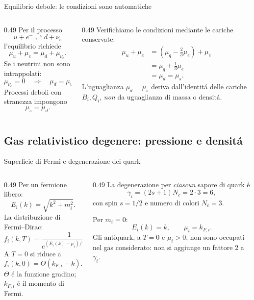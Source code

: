 \begin{frame}[t]{Equilibrio debole: le condizioni sono automatiche}
\small
\begin{columns}[T,onlytextwidth]
\begin{column}{0.49\textwidth}
Per il processo
\[
u+e^-\rightleftharpoons d+\nu_e
\]
l'equilibrio richiede
\[
\mu_u+\mu_e=\mu_d+\mu_{\nu_e}.
\]
Se i neutrini non sono intrappolati:
\[
\mu_{\nu_e}=0
\quad\Rightarrow\quad
\mu_d=\mu_u+\mu_e.
\]
Processi deboli con stranezza impongono
\[
\mu_s=\mu_d.
\]
\end{column}
\begin{column}{0.49\textwidth}
Verifichiamo le condizioni mediante le cariche conservate:
\[
\begin{aligned}
\mu_u+\mu_e
&=\left(\mu_q-\tfrac23\mu_e\right)+\mu_e\\
&=\mu_q+\tfrac13\mu_e\\
&=\mu_d=\mu_s.
\end{aligned}
\]
L'uguaglianza $\mu_d=\mu_s$ deriva dall'identit\'a delle cariche $B_i,Q_i$, \emph{non} da uguaglianza di massa o densit\'a.
\end{column}
\end{columns}
\end{frame}

\subsection{Gas relativistico degenere: pressione e densit\'a}

\begin{frame}[t]{Superficie di Fermi e degenerazione dei quark}
\small
\begin{columns}[T,onlytextwidth]
\begin{column}{0.49\textwidth}
Per un fermione libero:
\[
E_i(k)=\sqrt{k^2+m_i^2}.
\]
La distribuzione di Fermi--Dirac:
\[
f_i(k,T)=\frac{1}{e^{(E_i(k)-\mu_i)/T}+1}.
\]
A $T=0$ si riduce a
\[
f_i(k,0)=\Theta(k_{F,i}-k).
\]
$\Theta$ \'e la funzione gradino; $k_{F,i}$ \'e il momento di Fermi.
\end{column}
\begin{column}{0.49\textwidth}
La degenerazione per \emph{ciascun} sapore di quark \'e
\[
\gamma_i=(2s+1)N_c=2\cdot3=6,
\]
con spin $s=1/2$ e numero di colori $N_c=3$.

Per $m_i=0$:
\[
E_i(k)=k,\qquad \mu_i=k_{F,i}.
\]
Gli antiquark, a $T=0$ e $\mu_i>0$, non sono occupati nel gas considerato: non si aggiunge un fattore 2 a $\gamma_i$.
\end{column}
\end{columns}
\end{frame}

